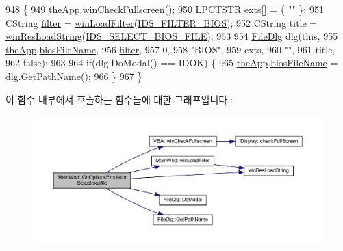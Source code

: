 \begin{DoxyCode}
948 \{
949   \mbox{\hyperlink{_v_b_a_8cpp_a8095a9d06b37a7efe3723f3218ad8fb3}{theApp}}.\mbox{\hyperlink{class_v_b_a_a340eaeeb7fcfc242f08ac3442d991a96}{winCheckFullscreen}}();
950   LPCTSTR exts[] = \{ \textcolor{stringliteral}{""} \};
951   CString \mbox{\hyperlink{_s_d_l_8cpp_af0122ee4312107103b580a98c74a4ea6}{filter}} = \mbox{\hyperlink{class_main_wnd_a7adc4aa2a10246fa13637e9d0870843d}{winLoadFilter}}(\mbox{\hyperlink{resource_8h_afb7f8f7e2247dd68e382f331eb143dce}{IDS\_FILTER\_BIOS}});
952   CString title = \mbox{\hyperlink{_win_res_util_8cpp_a416e85e80ab9b01376e87251c83d1a5a}{winResLoadString}}(\mbox{\hyperlink{resource_8h_afa25411d5bcc3bfabb0cfb453d0b5418}{IDS\_SELECT\_BIOS\_FILE}});
953 
954   \mbox{\hyperlink{class_file_dlg}{FileDlg}} dlg(\textcolor{keyword}{this},
955               \mbox{\hyperlink{_v_b_a_8cpp_a8095a9d06b37a7efe3723f3218ad8fb3}{theApp}}.\mbox{\hyperlink{class_v_b_a_a7bc70f5f75c0e2e3e2b1b63411af4559}{biosFileName}},
956               \mbox{\hyperlink{_s_d_l_8cpp_af0122ee4312107103b580a98c74a4ea6}{filter}},
957               0,
958               \textcolor{stringliteral}{"BIOS"},
959               exts,
960               \textcolor{stringliteral}{""}, 
961               title,
962               \textcolor{keyword}{false});
963   
964   \textcolor{keywordflow}{if}(dlg.DoModal() == IDOK) \{
965     \mbox{\hyperlink{_v_b_a_8cpp_a8095a9d06b37a7efe3723f3218ad8fb3}{theApp}}.\mbox{\hyperlink{class_v_b_a_a7bc70f5f75c0e2e3e2b1b63411af4559}{biosFileName}} = dlg.GetPathName();
966   \}
967 \}
\end{DoxyCode}
이 함수 내부에서 호출하는 함수들에 대한 그래프입니다.\+:
\nopagebreak
\begin{figure}[H]
\begin{center}
\leavevmode
\includegraphics[width=350pt]{class_main_wnd_a7a3ee694ccb8d2fd21066b71d93cef22_cgraph}
\end{center}
\end{figure}
\mbox{\label{class_main_wnd_a5f538c28cfe7007a8dd651215f6e4768}} 
